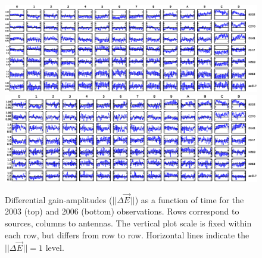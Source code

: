 \documentclass[]{aa}
\newcommand{\jones}[2]{\vec {#1}_{#2}}
\begin{document}
\begin{figure}
\sidecaption
\parbox[b]{12cm}{
\includegraphics[width=12cm]{o2003_dE_mean} \\
\includegraphics[width=12cm]{o2006_dE_mean}
}
\caption{\label{fig:dEampl}Differential gain-amplitudes ($||\Delta\jones{E}{}||$) as a function of time for the 2003 (top) and 2006 (bottom) observations. Rows correspond to sources, columns to antennas. The vertical plot scale is fixed within each row, but differs from row to row. Horizontal lines indicate the $||\Delta\jones{E}{}||=1$ level.}
\end{figure}
\end{document}
